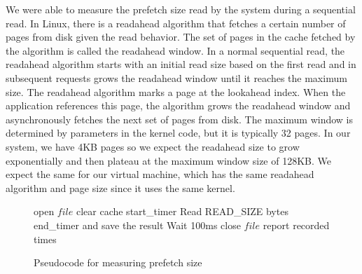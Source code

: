 We were able to measure the prefetch size read by the system during a sequential 
read. In Linux, there is a readahead algorithm that fetches a certain number of 
pages from disk given the read behavior. The set of pages in the cache fetched by 
the algorithm is called the readahead window. In a normal sequential read, the 
readahead algorithm starts with an initial read size based on the first read and in
subsequent requests grows the readahead window until it reaches the maximum size. 
The readahead algorithm marks a page at the lookahead index. When the application 
references this page, the algorithm grows the readahead window and asynchronously 
fetches the next set of pages from disk. The maximum window is determined by 
parameters in the kernel code, but it is typically 32 pages. In our system, we have
4KB pages so we expect the readahead size to grow exponentially and then plateau at
the maximum window size of 128KB. We expect the same for our virtual machine, which 
has the same readahead algorithm and page size since it uses the same kernel.

\begin{figure}[t!]
	\begin{algorithmic}
		\STATE open $file$
		\STATE clear cache
		\STATE start\_timer
		\STATE Read READ\_SIZE bytes
		\STATE end\_timer and save the result
		\STATE Wait 100ms
		\ENDFOR
		\STATE close $file$
		\STATE report recorded times
	\end{algorithmic}
	\caption{Pseudocode for measuring prefetch size}
	\label{fig:p2_code}
\end{figure}

